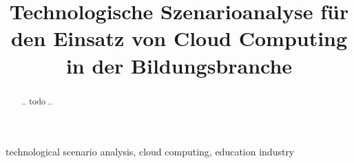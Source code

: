 \documentclass[conference]{IEEEtran}
\begin{document}
\title{Technologische Szenarioanalyse für den Einsatz von Cloud Computing in der Bildungsbranche}

\author{
}

\maketitle

\begin{abstract}
.. todo ..
\end{abstract}

\begin{IEEEkeywords}
technological scenario analysis, cloud computing, education industry
\end{IEEEkeywords}

\end{document}
